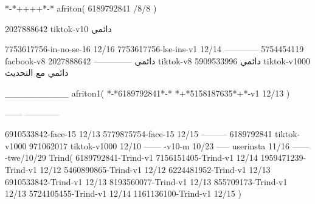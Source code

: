 *-*++++*-*
afriton(
6189792841 /8/8
)

2027888642 tiktok-v10
دائمي

7753617756-in-no-se-16 12/16
7753617756-lse-ins-v1 12/14
------------
5754454119 facbook-v8
دائمي
--------------
2027888642 tiktok-v8
دائمي
5909533996 tiktok-v1000
دائمي مع التحديث

__________
afriton1(
*-*6189792841*-*
*+*5158187635*+*-v1 12/13
)

------
------------


6910533842-face-15 12/13
5779875754-face-15 12/15
---------
6189792841 tiktok-v1000
971062017 tiktok-v1000 12/10
------
-v10-m 10/23
-----
userinsta 11/16
------
-twe/10/29
Trind(
6189792841-Trind-v1 
7156151405-Trind-v1 12/14
1959471239-Trind-v1 12/12
5460890865-Trind-v1 12/12
6224481952-Trind-v1 12/13
6910533842-Trind-v1 12/13
8193560077-Trind-v1 12/13
855709173-Trind-v1 12/13
5724105455-Trind-v1 12/14
1161136100-Trind-v1 12/15
)
